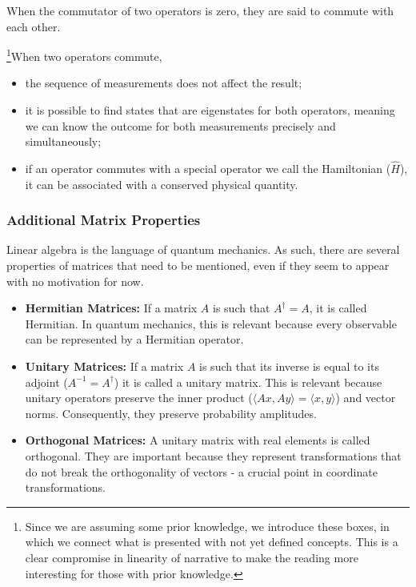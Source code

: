 When the commutator of two operators is zero, they are said to commute with each other.

\begin{JTD}
\footnote{Since we are assuming some prior knowledge, we introduce these boxes, in which we connect what is presented with not yet defined concepts. This is a clear compromise in linearity of narrative to make the reading more interesting for those with prior knowledge.}When two operators commute,
    \begin{itemize}
        \item the sequence of measurements does not affect the result;
        \item it is possible to find states that are eigenstates for both operators, meaning we can know the outcome for both measurements precisely and simultaneously;
        \item if an operator commutes with a special operator we call the Hamiltonian ($\hat{H}$), it can be associated with a conserved physical quantity.
    \end{itemize}
\end{JTD}

\subsubsection{Additional Matrix Properties}
Linear algebra is the language of quantum mechanics. As such, there are several properties of matrices that need to be mentioned, even if they seem to appear with no motivation for now.
\begin{itemize}
    \item \textbf{Hermitian Matrices:} If a matrix $A$ is such that $A^\dagger = A$, it is called Hermitian. In quantum mechanics, this is relevant because every observable can be represented by a Hermitian operator. 
    \item \textbf{Unitary Matrices:} If a matrix $A$ is such that its inverse is equal to its adjoint ($A^{-1} = A^{\dagger}$) it is called a unitary matrix. This is relevant because unitary operators preserve the inner product ($\langle Ax, Ay\rangle =\langle x, y\rangle $) and vector norms. Consequently, they preserve probability amplitudes.
    \item \textbf{Orthogonal Matrices:} A unitary matrix with real elements is called orthogonal. They are important because they represent transformations that do not break the orthogonality of vectors - a crucial point in coordinate transformations.
\end{itemize}


